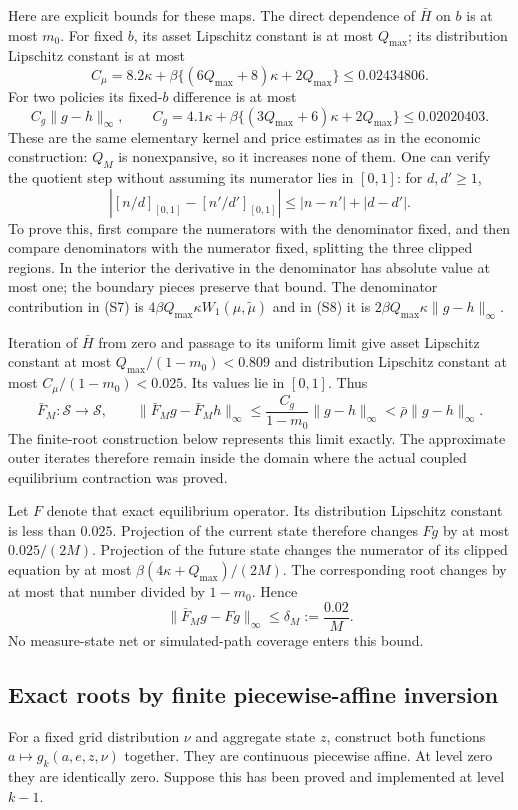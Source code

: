 \documentclass[11pt,a4paper]{article}
\begin{document}
Here are explicit bounds for these maps. The direct dependence of
$\bar H$ on $b$ is at most $m_0$. For fixed $b$, its asset Lipschitz
constant is at most $Q_{\max}$; its distribution Lipschitz constant is
at most
\[
 C_\mu=
 8.2\kappa+\beta\{(6Q_{\max}+8)\kappa+2Q_{\max}\}
 \leq0.02434806.
 \tag{S7}
\]
For two policies its fixed-$b$ difference is at most
\[
 C_g\|g-h\|_\infty,\qquad
 C_g=4.1\kappa+
 \beta\{(3Q_{\max}+6)\kappa+2Q_{\max}\}
 \leq0.02020403.
 \tag{S8}
\]
These are the same elementary kernel and price estimates as in the
economic construction: $Q_M$ is nonexpansive, so it increases none of
them. One can verify the quotient step without assuming its numerator
lies in $[0,1]$: for $d,d'\geq1$,
\[
 |[n/d]_{[0,1]}-[n'/d']_{[0,1]}|
 \leq |n-n'|+|d-d'|.
 \tag{S9}
\]
To prove this, first compare the numerators with the denominator fixed,
and then compare denominators with the numerator fixed, splitting the
three clipped regions. In the interior the derivative in the denominator
has absolute value at most one; the boundary pieces preserve that bound.
The denominator contribution in \textup{(S7)} is
$4\beta Q_{\max}\kappa W_1(\mu,\tilde\mu)$ and in
\textup{(S8)} it is $2\beta Q_{\max}\kappa\|g-h\|_\infty$.

Iteration of $\bar H$ from zero and passage to its uniform limit
give asset Lipschitz constant at most
$Q_{\max}/(1-m_0)<0.809$ and distribution Lipschitz constant at most
$C_\mu/(1-m_0)<0.025$. Its values lie in $[0,1]$. Thus
\[
 \bar F_M:\mathcal S\longrightarrow\mathcal S,\qquad
 \|\bar F_Mg-\bar F_Mh\|_\infty
 \leq\frac{C_g}{1-m_0}\|g-h\|_\infty
 <\bar\rho\|g-h\|_\infty .
 \tag{S10}
\]
The finite-root construction below represents this limit exactly.
The approximate outer iterates therefore remain inside the domain
where the actual coupled equilibrium contraction was proved.

Let $F$ denote that exact equilibrium operator. Its distribution
Lipschitz constant is less than $0.025$. Projection of the current state
therefore changes $Fg$ by at most $0.025/(2M)$. Projection of the future
state changes the numerator of its clipped equation by at most
$\beta(4\kappa+Q_{\max})/(2M)$. The corresponding root changes by at most
that number divided by $1-m_0$. Hence
\[
 \|\bar F_Mg-Fg\|_\infty\leq\delta_M:=\frac{0.02}{M}.
 \tag{S11}
\]
No measure-state net or simulated-path coverage enters this bound.

\subsection{Exact roots by finite piecewise-affine inversion}
For a fixed grid distribution $\nu$ and aggregate state $z$, construct
both functions $a\mapsto g_k(a,e,z,\nu)$ together. They are continuous
piecewise affine. At level zero they are identically zero. Suppose this
has been proved and implemented at level $k-1$.
\end{document}
